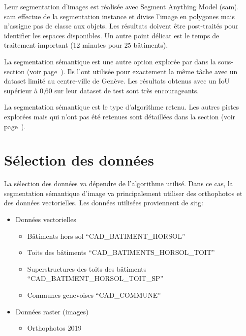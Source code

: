 Leur segmentation d'images est réalisée avec Segment Anything Model (\acrshort{sam}). \acrshort{sam} effectue de la segmentation instance et divise l'image en polygones mais n'assigne pas de classe aux objets. Les résultats doivent être post-traités pour identifier les espaces disponibles. Un autre point délicat est le temps de traitement important (12 minutes pour 25 bâtiments).

La segmentation sémantique est une autre option explorée par \citeauthor{castello_quantification_2021} dans la sous-section \textit{} (voir page~\pageref{subsec:castello_quantification_2021}). Ils l'ont utilisée pour exactement la même tâche avec un dataset limité au centre-ville de Genève. Les résultats obtenus avec un IoU supérieur à 0,60 sur leur dataset de test sont très encourageants.

La segmentation sémantique est le type d'algorithme retenu. Les autres pistes explorées mais qui n'ont pas été retenues sont détaillées dans la section \textit{} (voir page~\pageref{sec:pistes_explorees}).

\section{Sélection des données}
La sélection des données va dépendre de l'algorithme utilisé. Dans ce cas, la segmentation sémantique d'image va principalement utiliser des orthophotos et des données vectorielles. Les données utilisées proviennent de \acrshort{sitg}:
\begin{itemize}
    \item Données vectorielles
    \begin{itemize}
        \item Bâtiments hors-sol ``CAD\_BATIMENT\_HORSOL'' \cite{sitg_batiments_nodate}
        \item Toits des bâtiments ``CAD\_BATIMENTS\_HORSOL\_TOIT'' \cite{sitg_toits_nodate}
        \item Superstructures des toits des bâtiments ``CAD\_BATIMENT\_HORSOL\_TOIT\_SP'' \cite{sitg_superstructures_nodate}
        \item Communes genevoises ``CAD\_COMMUNE'' \cite{sitg_communes_nodate}
    \end{itemize}
    \item Données raster (images)
    \begin{itemize}
        \item Orthophotos 2019 \cite{sitg_orthophotos_nodate}
    \end{itemize}
\end{itemize}


